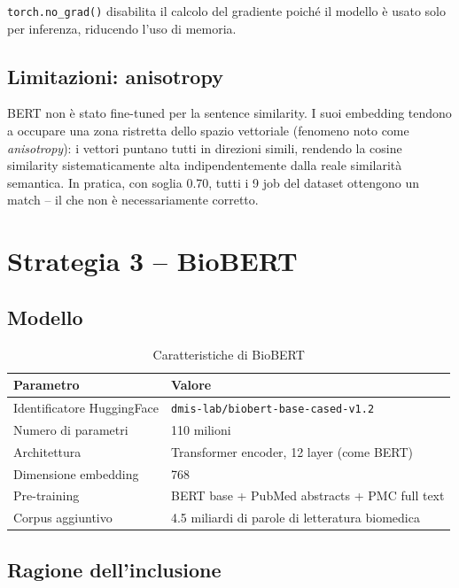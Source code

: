 \documentclass[12pt, a4paper]{report}
\begin{document}
\texttt{torch.no\_grad()} disabilita il calcolo del gradiente poiché
il modello è usato solo per inferenza, riducendo l'uso di memoria.

\subsection{Limitazioni: anisotropy}
\label{sec:anisotropy}

BERT non è stato fine-tuned per la sentence similarity. I suoi
embedding tendono a occupare una zona ristretta dello spazio
vettoriale (fenomeno noto come \emph{anisotropy}): i vettori puntano
tutti in direzioni simili, rendendo la cosine similarity
sistematicamente alta indipendentemente dalla reale similarità
semantica. In pratica, con soglia 0.70, tutti i 9 job del dataset
ottengono un match -- il che non è necessariamente corretto.

% 
\section{Strategia 3 -- BioBERT}

\subsection{Modello}

\begin{table}[H]
\centering
\begin{tabular}{ll}
\toprule
\textbf{Parametro} & \textbf{Valore} \\
\midrule
Identificatore HuggingFace & \texttt{dmis-lab/biobert-base-cased-v1.2} \\
Numero di parametri & 110 milioni \\
Architettura & Transformer encoder, 12 layer (come BERT) \\
Dimensione embedding & 768 \\
Pre-training & BERT base + PubMed abstracts + PMC full text \\
Corpus aggiuntivo & 4.5 miliardi di parole di letteratura biomedica \\
\bottomrule
\end{tabular}
\caption{Caratteristiche di BioBERT}
\end{table}

\subsection{Ragione dell'inclusione}
\end{document}
